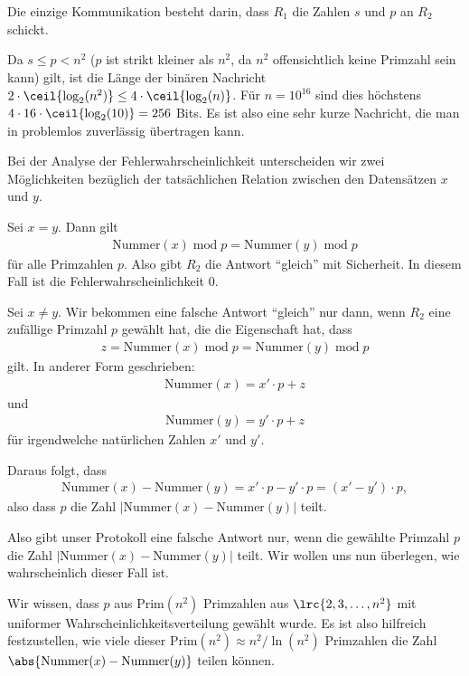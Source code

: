 	Die einzige Kommunikation besteht darin, dass $R_1$ die Zahlen $s$ und $p$ an $R_2$ schickt.

	Da $s\leq p < n^2$ ($p$ ist strikt kleiner als $n^2$, da $n^2$ offensichtlich keine Primzahl sein kann) gilt, ist die Länge der binären Nachricht $2\cdot \ceil{\log_2(n^2)}\leq 4\cdot \ceil{\log_2(n)}$.
	Für $n = 10^{16}$ sind dies höchstens $4\cdot 16\cdot \ceil{\log_2(10)}=256$ Bits. Es ist also eine sehr kurze Nachricht, die man in problemlos zuverlässig übertragen kann.

	Bei der Analyse der Fehlerwahrscheinlichkeit unterscheiden wir zwei Möglichkeiten bezüglich der tatsächlichen Relation zwischen den Datensätzen $x$ und $y$.
	\begin{aenum}
		\item Sei $x = y$. Dann gilt
		\begin{align*}
			\text{Nummer}(x)\; \text{mod} \; p = \text{Nummer}(y)\; \text{mod} \; p
		\end{align*}
		für alle Primzahlen $p$. Also gibt $R_2$ die Antwort \enquote{gleich} mit Sicherheit. In diesem Fall ist die Fehlerwahrscheinlichkeit $0$.
		\item Sei $x\neq y$. Wir bekommen eine falsche Antwort \enquote{gleich} nur dann, wenn $R_2$ eine zufällige Primzahl $p$ gewählt hat, die die Eigenschaft hat, dass
		\begin{align*}
			z = \text{Nummer}(x)\; \text{mod} \; p = \text{Nummer}(y)\; \text{mod} \; p
		\end{align*}
		gilt. In anderer Form geschrieben:
		\begin{align*}
			\text{Nummer}(x) = x'\cdot p + z
		\end{align*}
		und
		\begin{align*}
			\text{Nummer}(y) = y'\cdot p + z
		\end{align*}
		für irgendwelche natürlichen Zahlen $x'$ und $y'$.

		Daraus folgt, dass
		\begin{align*}
			\text{Nummer}(x)-\text{Nummer}(y) = x'\cdot p -  y'\cdot p = (x'-y')\cdot p,
		\end{align*}
		also dass $p$ die Zahl $|\text{Nummer}(x)-\text{Nummer}(y)|$ teilt.

		Also gibt unser Protokoll eine falsche Antwort nur, wenn die gewählte Primzahl $p$ die Zahl $|\text{Nummer}(x)-\text{Nummer}(y)|$ teilt. Wir wollen uns nun überlegen, wie wahrscheinlich dieser Fall ist.

		Wir wissen, dass $p$ aus $\text{Prim}(n^2)$ Primzahlen aus $\lrc{2,3,\ldots, n^2}$ mit uniformer Wahrscheinlichkeitsverteilung gewählt wurde. Es ist also hilfreich festzustellen, wie viele dieser $\text{Prim}(n^2)\approx n^2/\ln(n^2)$ Primzahlen die Zahl $\abs{\text{Nummer}(x)-\text{Nummer}(y)}$ teilen können.


\end{aenum}
